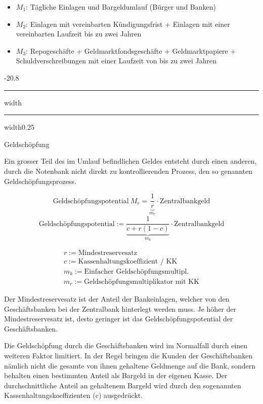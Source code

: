 \documentclass[9pt, landscape, fleqn]{scrartcl}
\makeatletter
\renewcommand{\subsection}{\@startsection{subsection}{1}{0mm}%
{-2\baselineskip}{0.8\baselineskip}%
{\hrule depth 0.2pt width\columnwidth\hrule depth0.75pt
width0.25\columnwidth\vspace*{1.2em}\large\bfseries\rmfamily}}
\makeatother
\begin{document}
\begin{multicols*}{3}
\begin{itemize}
    \item $M_1$: Tägliche Einlagen und Bargeldumlauf (Bürger und Banken)
    \item $M_2$: Einlagen mit vereinbarten Kündigungsfrist + Einlagen mit einer vereinbarten Laufzeit bis zu zwei Jahren 
    \item $M_3$: Repogeschäfte + Geldmarktfondsgeschäfte + Geldmarktpapiere + Schuldverschreibungen mit einer Laufzeit von bis zu zwei Jahren 
\end{itemize}

\subsection{Geldschöpfung}

Ein grosser Teil des im Umlauf befindlichen Geldes entsteht durch einen anderen, durch die Notenbank nicht direkt zu kontrollierenden Prozess, den so genannten Geldschöpfungsprozess.

\begin{equation}
   \text{Geldschöpfungspotential}~ M_r = \underbrace{\frac{1}{r}}_{m_r}\cdot \text {Zentralbankgeld}
\end{equation}
\begin{equation}
    \text{Geldschöpfungspotential}:= \underbrace{\frac{1}{c+r(1-c)}}_{m_k}\cdot \text {Zentralbankgeld}
\end{equation}   

\begin{align}
    r := \text{Mindestreservesatz} \\
    c := \text{Kassenhaltungskoeffizient / KK} \\
    m_k := \text{Einfacher Geldschöpfungsmultipl.} \\
    m_r := \text{Geldschöpfungsmultiplikator mit KK} 
\end{align}

Der Mindestreservesatz ist der Anteil der Bankeinlagen, welcher von den Geschäftsbanken bei der Zentralbank hinterlegt werden muss. Je höher der Mindestreservesatz ist, desto geringer ist das Geldschöpfungspotential der Geschäftsbanken. \newline 

Die Geldschöpfung durch die Geschäftsbanken wird im Normalfall durch einen weiteren Faktor limitiert. In der Regel bringen die Kunden der Geschäftsbanken nämlich nicht die gesamte von ihnen gehaltene Geldmenge auf die Bank, sondern behalten einen bestimmten Anteil als Bargeld in der eigenen Kasse. Der durchschnittliche Anteil an gehaltenem Bargeld wird durch den sogenannten Kassenhaltungskoeffizienten (c) ausgedrückt.


\end{multicols*}
\end{document}
